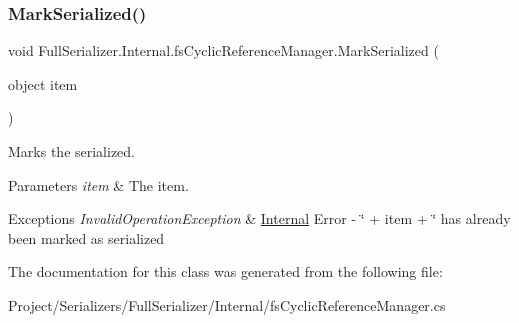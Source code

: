 \subsubsection{\texorpdfstring{Mark\+Serialized()}{MarkSerialized()}}
{\footnotesize\ttfamily void Full\+Serializer.\+Internal.\+fs\+Cyclic\+Reference\+Manager.\+Mark\+Serialized (\begin{DoxyParamCaption}\item[{object}]{item }\end{DoxyParamCaption})\hspace{0.3cm}{\ttfamily [inline]}}



Marks the serialized. 


\begin{DoxyParams}{Parameters}
{\em item} & The item.\\
\hline
\end{DoxyParams}

\begin{DoxyExceptions}{Exceptions}
{\em Invalid\+Operation\+Exception} & \hyperlink{namespace_full_serializer_1_1_internal}{Internal} Error -\/ \char`\"{} + item +
                    \char`\"{} has already been marked as serialized\\
\hline
\end{DoxyExceptions}


The documentation for this class was generated from the following file\+:\begin{DoxyCompactItemize}
\item 
Project/\+Serializers/\+Full\+Serializer/\+Internal/fs\+Cyclic\+Reference\+Manager.\+cs\end{DoxyCompactItemize}
